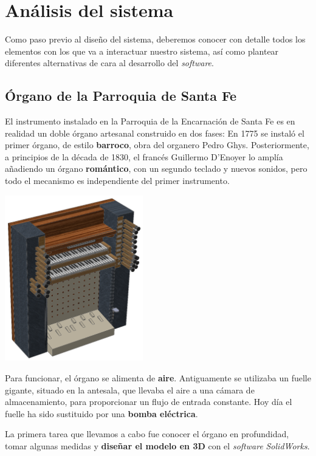 \documentclass[10pt,a4paper]{article}
\begin{document}
	
	\section{Análisis del sistema}

	Como paso previo al diseño del sistema, deberemos conocer con detalle todos
	los elementos con los que va a interactuar nuestro sistema, así como
	plantear diferentes alternativas de cara al desarrollo del
	\textit{software}.

	\subsection{Órgano de la Parroquia de Santa Fe}

	El instrumento instalado en la Parroquia de la Encarnación de Santa Fe es en
	realidad un doble órgano artesanal construido en dos fases: En 1775 se
	instaló el primer órgano, de estilo \textbf{barroco}, obra del organero
	Pedro Ghys. Posteriormente, a principios de la década de 1830, el francés
	Guillermo D'Enoyer lo amplía añadiendo un órgano \textbf{romántico}, con un
	segundo teclado y nuevos sonidos, pero todo el mecanismo es independiente
	del primer instrumento.
	
	\begin{multicols}{2}
		\noindent
		\begin{center}
			\includegraphics[width=0.45\textwidth]{images/organo} 
		\end{center}
		\columnbreak
		Para funcionar, el órgano se alimenta de \textbf{aire}. Antiguamente se utilizaba un fuelle gigante, situado en la antesala, que llevaba el aire a una cámara de almacenamiento, para proporcionar un flujo de entrada constante. Hoy día el fuelle ha sido sustituido por una \textbf{bomba eléctrica}.
		
		La primera tarea que llevamos a cabo fue conocer el órgano en profundidad, tomar algunas medidas y \textbf{diseñar el modelo en 3D} con el \textit{software} \textit{SolidWorks}.
	\end{multicols}
	
\end{document}
